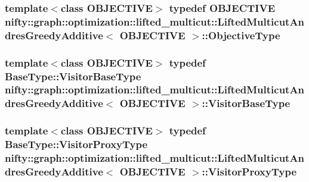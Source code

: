 \subsubsection[{Objective\+Type}]{\setlength{\rightskip}{0pt plus 5cm}template$<$class O\+B\+J\+E\+C\+T\+I\+V\+E$>$ typedef O\+B\+J\+E\+C\+T\+I\+V\+E {\bf nifty\+::graph\+::optimization\+::lifted\+\_\+multicut\+::\+Lifted\+Multicut\+Andres\+Greedy\+Additive}$<$ O\+B\+J\+E\+C\+T\+I\+V\+E $>$\+::{\bf Objective\+Type}}\label{classnifty_1_1graph_1_1optimization_1_1lifted__multicut_1_1LiftedMulticutAndresGreedyAdditive_a62516810a19b7736ea691d5d2958d444}
\hypertarget{classnifty_1_1graph_1_1optimization_1_1lifted__multicut_1_1LiftedMulticutAndresGreedyAdditive_a070556ac4d486f931c1e1b286f106645}{}
\subsubsection[{Visitor\+Base\+Type}]{\setlength{\rightskip}{0pt plus 5cm}template$<$class O\+B\+J\+E\+C\+T\+I\+V\+E$>$ typedef {\bf Base\+Type\+::\+Visitor\+Base\+Type} {\bf nifty\+::graph\+::optimization\+::lifted\+\_\+multicut\+::\+Lifted\+Multicut\+Andres\+Greedy\+Additive}$<$ O\+B\+J\+E\+C\+T\+I\+V\+E $>$\+::{\bf Visitor\+Base\+Type}}\label{classnifty_1_1graph_1_1optimization_1_1lifted__multicut_1_1LiftedMulticutAndresGreedyAdditive_a070556ac4d486f931c1e1b286f106645}
\hypertarget{classnifty_1_1graph_1_1optimization_1_1lifted__multicut_1_1LiftedMulticutAndresGreedyAdditive_a706e405951c302b86fafbcea85f7ce83}{}
\subsubsection[{Visitor\+Proxy\+Type}]{\setlength{\rightskip}{0pt plus 5cm}template$<$class O\+B\+J\+E\+C\+T\+I\+V\+E$>$ typedef {\bf Base\+Type\+::\+Visitor\+Proxy\+Type} {\bf nifty\+::graph\+::optimization\+::lifted\+\_\+multicut\+::\+Lifted\+Multicut\+Andres\+Greedy\+Additive}$<$ O\+B\+J\+E\+C\+T\+I\+V\+E $>$\+::{\bf Visitor\+Proxy\+Type}}\label{classnifty_1_1graph_1_1optimization_1_1lifted__multicut_1_1LiftedMulticutAndresGreedyAdditive_a706e405951c302b86fafbcea85f7ce83}


